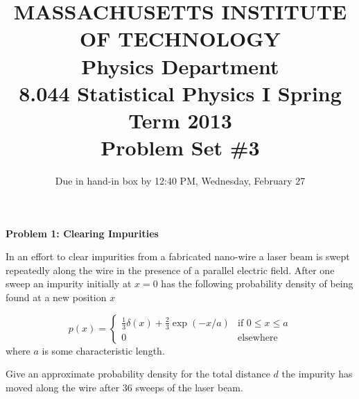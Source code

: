 \documentclass{article}
\begin{document}
\title{MASSACHUSETTS INSTITUTE OF TECHNOLOGY \\
Physics Department \\
8.044 Statistical Physics I Spring Term 2013 \\
Problem Set \#3}
\date{Due in hand-in box by 12:40 PM, Wednesday, February 27}
\maketitle

\noindent
\textbf{Problem 1: Clearing Impurities}

In an effort to clear impurities from a fabricated nano-wire a laser beam is swept repeatedly
along the wire in the presence of a parallel electric field. After one sweep an impurity initially
at $x = 0$ has the following probability density of being found at a new position $x$

\[
p(x) = 
\begin{cases} 
\frac{1}{3} \delta(x) + \frac{2}{3} \exp(-x/a) & \text{if } 0 \leq x \leq a \\
0 & \text{elsewhere}
\end{cases}
\]
where $a$ is some characteristic length.

Give an approximate probability density for the total distance $d$ the impurity has moved 
along the wire after 36 sweeps of the laser beam.
\end{document}
